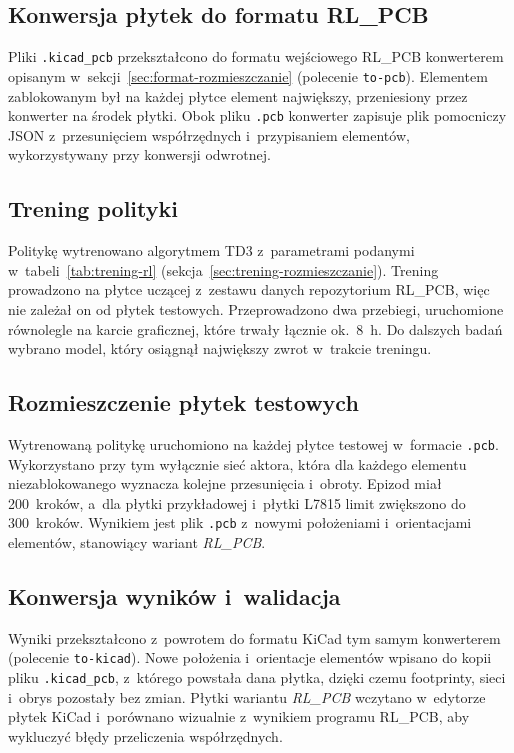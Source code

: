 \subsection{Konwersja płytek do formatu RL\_PCB}
\label{sec:exp-rl-konwersja}

Pliki \texttt{.kicad\_pcb} przekształcono do formatu wejściowego RL\_PCB
konwerterem opisanym w~sekcji~\ref{sec:format-rozmieszczanie}
(polecenie \texttt{to-pcb}). Elementem zablokowanym był na każdej płytce
element największy, przeniesiony przez konwerter na środek płytki. Obok
pliku \texttt{.pcb} konwerter zapisuje plik pomocniczy JSON z~przesunięciem
współrzędnych i~przypisaniem elementów, wykorzystywany przy konwersji
odwrotnej.

\subsection{Trening polityki}
\label{sec:exp-rl-trening}

Politykę wytrenowano algorytmem TD3 z~parametrami podanymi
w~tabeli~\ref{tab:trening-rl} (sekcja~\ref{sec:trening-rozmieszczanie}).
Trening prowadzono na płytce uczącej z~zestawu danych repozytorium RL\_PCB,
więc nie zależał on od płytek testowych. Przeprowadzono dwa przebiegi,
uruchomione równolegle na karcie graficznej, które trwały łącznie ok.~8~h.
Do dalszych badań wybrano model, który osiągnął największy zwrot
w~trakcie treningu.

\subsection{Rozmieszczenie płytek testowych}
\label{sec:exp-rl-polityka}

Wytrenowaną politykę uruchomiono na każdej płytce testowej w~formacie
\texttt{.pcb}. Wykorzystano przy tym wyłącznie sieć aktora, która dla
każdego elementu niezablokowanego wyznacza kolejne przesunięcia
i~obroty. Epizod miał 200~kroków, a~dla płytki przykładowej i~płytki
L7815 limit zwiększono do 300~kroków.
Wynikiem jest plik \texttt{.pcb} z~nowymi położeniami
i~orientacjami elementów, stanowiący wariant \emph{RL\_PCB}.

\subsection{Konwersja wyników i~walidacja}
\label{sec:exp-rl-walidacja}

Wyniki przekształcono z~powrotem do formatu KiCad tym samym konwerterem
(polecenie \texttt{to-kicad}). Nowe położenia i~orientacje elementów
wpisano do kopii pliku \texttt{.kicad\_pcb}, z~którego powstała dana
płytka, dzięki czemu footprinty, sieci i~obrys pozostały bez zmian.
Płytki wariantu \emph{RL\_PCB} wczytano w~edytorze płytek KiCad
i~porównano wizualnie z~wynikiem programu RL\_PCB, aby wykluczyć błędy
przeliczenia współrzędnych.

